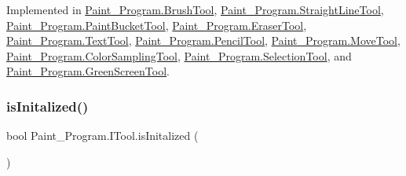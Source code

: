 Implemented in \mbox{\hyperlink{class_paint___program_1_1_brush_tool_a8cfef3d531b3e9dcb37d81a5ac0a9ad5}{Paint\+\_\+\+Program.\+Brush\+Tool}}, \mbox{\hyperlink{class_paint___program_1_1_straight_line_tool_a4c3cce5f1141100f04ed3a653d6936a1}{Paint\+\_\+\+Program.\+Straight\+Line\+Tool}}, \mbox{\hyperlink{class_paint___program_1_1_paint_bucket_tool_a2de33717bdf3555d97e5e6e962602f85}{Paint\+\_\+\+Program.\+Paint\+Bucket\+Tool}}, \mbox{\hyperlink{class_paint___program_1_1_eraser_tool_ac19c1e6bfa1b51a384f1f9b1eaa0b2ea}{Paint\+\_\+\+Program.\+Eraser\+Tool}}, \mbox{\hyperlink{class_paint___program_1_1_text_tool_a8351e31f6387ff80cbff288a73a10a3d}{Paint\+\_\+\+Program.\+Text\+Tool}}, \mbox{\hyperlink{class_paint___program_1_1_pencil_tool_ac37cf5b5ccdb57fedfa21326d795cb65}{Paint\+\_\+\+Program.\+Pencil\+Tool}}, \mbox{\hyperlink{class_paint___program_1_1_move_tool_a4dd44350bc5ba897034dca53182ac3e5}{Paint\+\_\+\+Program.\+Move\+Tool}}, \mbox{\hyperlink{class_paint___program_1_1_color_sampling_tool_ae6d5a44df3a4394f7da352d1170bea54}{Paint\+\_\+\+Program.\+Color\+Sampling\+Tool}}, \mbox{\hyperlink{class_paint___program_1_1_selection_tool_afadcc35f14a6e833a09c225a4efc1ed7}{Paint\+\_\+\+Program.\+Selection\+Tool}}, and \mbox{\hyperlink{class_paint___program_1_1_green_screen_tool_a957c8149c7cc59b1c9734ca5bb5309c7}{Paint\+\_\+\+Program.\+Green\+Screen\+Tool}}.

\mbox{\label{interface_paint___program_1_1_i_tool_a951b844bcbf47a6c306104fa86be7a5d}} 
\subsubsection{\texorpdfstring{is\+Initalized()}{isInitalized()}}
{\footnotesize\ttfamily bool Paint\+\_\+\+Program.\+I\+Tool.\+is\+Initalized (\begin{DoxyParamCaption}{ }\end{DoxyParamCaption})}



